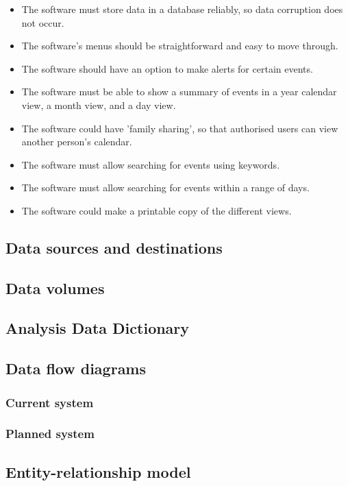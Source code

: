 \begin{itemize}
  \item The software must store data in a database reliably, so
        data corruption does not occur.
  \item The software's menus should be straightforward and easy to move
        through.
  \item The software should have an option to make alerts for certain
        events.
  \item The software must be able to show a summary of events in a
        year calendar view, a month view, and a day view.
  \item The software could have 'family sharing', so that authorised
        users can view another person's calendar.
  \item The software must allow searching for events using keywords.
  \item The software must allow searching for events within a range of
        days.
  \item The software could make a printable copy of the different
        views.
\end{itemize}


\lipsum
\subsection{Data sources and destinations}
\lipsum
\subsection{Data volumes}
\lipsum
\subsection{Analysis Data Dictionary}
\lipsum
\subsection{Data flow diagrams}
\subsubsection{Current system}
\lipsum
\subsubsection{Planned system}
\lipsum
\subsection{Entity-relationship model}
\lipsum
